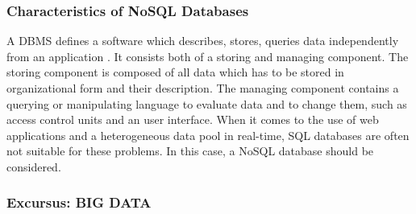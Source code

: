 \subsubsection{Characteristics of NoSQL Databases}

A \ac{DBMS} defines a software which describes, stores, queries data independently from an application \cite[p.2 ff.]{nosql_meier}. It consists both of a storing and managing component. The storing component is composed of all data which has to be stored in organizational form and their description. The managing component contains a querying or manipulating language to evaluate data and to change them, such as access control units and an user interface. When it comes to the use of web applications and a heterogeneous data pool in real-time, SQL databases are often not suitable for these problems. In this case, a NoSQL database should be considered. 

\subsubsection{Excursus: BIG DATA} \label{bigdata}

